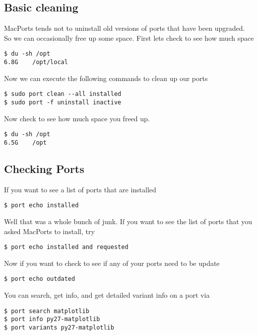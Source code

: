 \documentclass[11pt]{article}
\begin{document}
\subsection{Basic cleaning}
MacPorts tends not to uninstall old versions of ports that have been upgraded. So we can occasionally free up some space. First lets check to see how much space
\begin{lstlisting}[style=Bash]
$ du -sh /opt
6.8G	/opt/local
\end{lstlisting}
Now we can execute the following commands to clean up our ports
\begin{lstlisting}[style=Bash]
$ sudo port clean --all installed
$ sudo port -f uninstall inactive
\end{lstlisting}
Now check to see how much space you freed up.
\begin{lstlisting}[style=Bash]
$ du -sh /opt
6.5G	/opt
\end{lstlisting}


\subsection{Checking Ports}
If you want to see a list of ports that are installed
\begin{lstlisting}[style=Bash]
$ port echo installed
\end{lstlisting}
Well that was a whole bunch of junk. If you want to see the list of ports that you asked MacPorts to install, try
\begin{lstlisting}[style=Bash]
$ port echo installed and requested
\end{lstlisting}
Now if you want to check to see if any of your ports need to be update
\begin{lstlisting}[style=Bash]
$ port echo outdated
\end{lstlisting}
You can search, get info, and get detailed variant info on a port via
\begin{lstlisting}[style=Bash]
$ port search matplotlib
$ port info py27-matplotlib
$ port variants py27-matplotlib
\end{lstlisting}
\end{document}

